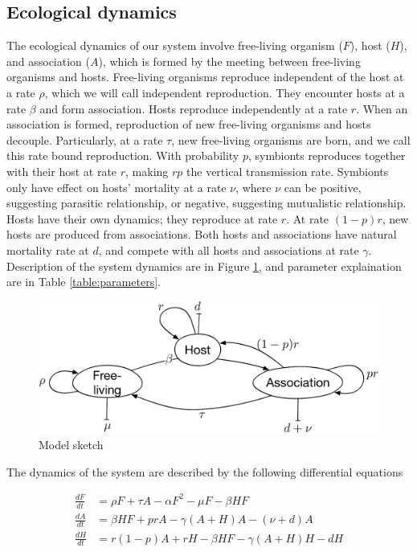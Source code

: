 \documentclass[11pt]{article}
\begin{document}
\subsection*{Ecological dynamics}

The ecological dynamics of our system involve free-living organism ($F$), host ($H$), and association ($A$), which is formed by the meeting between free-living organisms and hosts. Free-living organisms reproduce independent of the host at a rate $\rho$, which we will call independent reproduction. They encounter hosts at a rate $\beta$ and form association. Hosts reproduce independently at a rate $r$. When an association is formed, reproduction of new free-living organisms and hosts decouple. Particularly, at a rate $\tau$, new free-living organisms are born, and we call this rate bound reproduction. With probability $p$, symbionts reproduces together with their host at rate $r$, making $r p$ the vertical transmission rate. Symbionts only have effect on hosts' mortality at a rate $\nu$, where $\nu$ can be positive, suggesting parasitic relationship, or negative, suggesting mutualistic relationship. Hosts have their own dynamics; they reproduce at rate $r$. At rate $(1-p)r$, new hosts are produced from associations. Both hosts and associations have natural mortality rate at $d$, and compete with all hosts and associations at rate $\gamma$. Description of the system dynamics are in Figure \ref{Fig:model_sketch}, and  parameter explaination are in Table \ref{table:parameters}. 

\begin{figure}[ht!]
	\centering
	\includegraphics[width=0.7 \linewidth]{model_sketch}
	\caption{Model sketch}
	\label{Fig:model_sketch}
\end{figure}

The dynamics of the system are described by the following differential equations

\begin{align}
	\frac{dF}{dt}     & = \rho F +\tau A - \alpha F^2 - \mu F - \beta H F \\
	\frac{dA}{dt}    & = \beta H F +  p r A - \gamma (A + H) A - (\nu + d)  A \\
	\frac{dH}{dt}    & = r (1 - p) A + r  H -\beta H F   - \gamma (A + H) H - d H 
\end{align}
\end{document}

